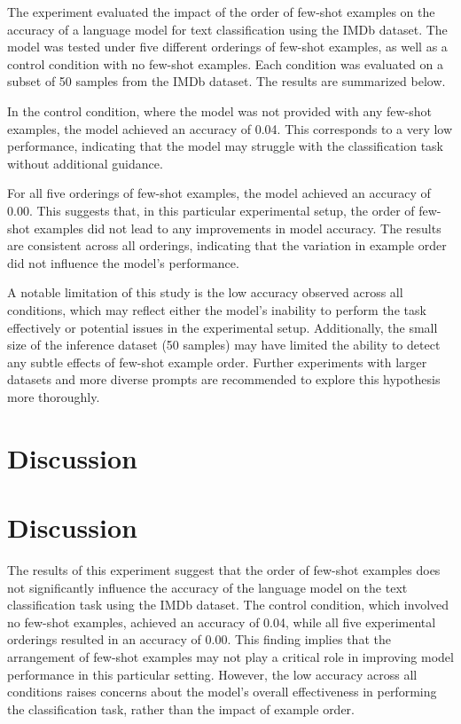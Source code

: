 \documentclass{article}
\begin{document}
The experiment evaluated the impact of the order of few-shot examples on the accuracy of a language model for text classification using the IMDb dataset. The model was tested under five different orderings of few-shot examples, as well as a control condition with no few-shot examples. Each condition was evaluated on a subset of 50 samples from the IMDb dataset. The results are summarized below.

In the control condition, where the model was not provided with any few-shot examples, the model achieved an accuracy of 0.04. This corresponds to a very low performance, indicating that the model may struggle with the classification task without additional guidance.

For all five orderings of few-shot examples, the model achieved an accuracy of 0.00. This suggests that, in this particular experimental setup, the order of few-shot examples did not lead to any improvements in model accuracy. The results are consistent across all orderings, indicating that the variation in example order did not influence the model's performance.

A notable limitation of this study is the low accuracy observed across all conditions, which may reflect either the model's inability to perform the task effectively or potential issues in the experimental setup. Additionally, the small size of the inference dataset (50 samples) may have limited the ability to detect any subtle effects of few-shot example order. Further experiments with larger datasets and more diverse prompts are recommended to explore this hypothesis more thoroughly.
\section{Discussion}
\section{Discussion}

The results of this experiment suggest that the order of few-shot examples does not significantly influence the accuracy of the language model on the text classification task using the IMDb dataset. The control condition, which involved no few-shot examples, achieved an accuracy of 0.04, while all five experimental orderings resulted in an accuracy of 0.00. This finding implies that the arrangement of few-shot examples may not play a critical role in improving model performance in this particular setting. However, the low accuracy across all conditions raises concerns about the model's overall effectiveness in performing the classification task, rather than the impact of example order.
\end{document}
